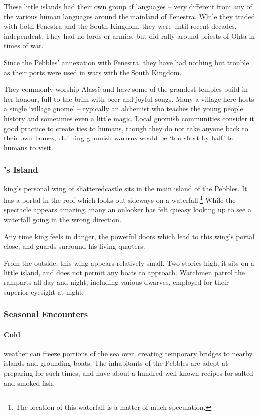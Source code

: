 \begin{multicols}{2}
These little islands had their own group of languages -- very different from any of the various human languages around the mainland of Fenestra.  While they traded with both Fenestra and the South Kingdom, they were until recent decades, independent.  They had no lords or armies, but did rally around priests of Ohta in times of war.

Since the Pebbles' annexation with Fenestra, they have had nothing but trouble as their ports were used in wars with the South Kingdom.

They commonly worship Alass\"{e} and have some of the grandest temples build in her honour, full to the brim with beer and joyful songs.
Many a village here hosts a single `village gnome' -- typically an alchemist who teaches the young people history and sometimes even a little magic.
Local gnomish communities consider it good practice to create ties to humans, though they do not take anyone back to their own homes, claiming gnomish warrens would be `too short by half' to humans to visit.

\subsubsection{'s Island}

\Gls{king}'s personal wing of \gls{shatteredcastle} sits in the main island of the Pebbles.
It has a portal in the roof which looks out sideways on a waterfall.\footnote{The location of this waterfall is a matter of much speculation.}
While the spectacle appears amazing, many an onlooker has felt queasy looking up to see a waterfall going in the wrong direction.

Any time \gls{king} feels in danger, the powerful doors which lead to this wing's portal close, and guards surround his living quarters.

From the outside, this wing appears relatively small.
Two stories high, it sits on a little island, and does not permit any boats to approach.
Watchmen patrol the ramparts all day and night, including various dwarves, employed for their superior eyesight at night.

\subsubsection{Seasonal Encounters}

\paragraph{Cold} weather can freeze portions of the sea over, creating temporary bridges to nearby islands and grounding boats.
The inhabitants of the Pebbles are adept at preparing for such times, and have about a hundred well-known recipes for salted and smoked fish.

\end{multicols}
